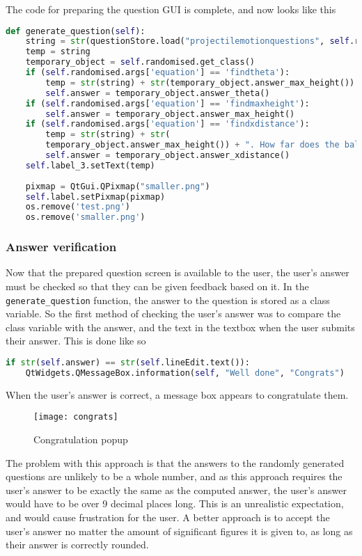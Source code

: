 The code for preparing the question GUI is complete, and now looks like this
\begin{lstlisting}[language=Python, caption=Completed question GUI preparation function]
def generate_question(self):
	string = str(questionStore.load("projectilemotionquestions", self.randomised))
	temp = string
	temporary_object = self.randomised.get_class()
	if (self.randomised.args['equation'] == 'findtheta'):
		temp = str(string) + str(temporary_object.answer_max_height()) + " Find theta in degreees."
		self.answer = temporary_object.answer_theta()
	if (self.randomised.args['equation'] == 'findmaxheight'):
		self.answer = temporary_object.answer_max_height()
	if (self.randomised.args['equation'] == 'findxdistance'):
		temp = str(string) + str(
		temporary_object.answer_max_height()) + ". How far does the ball travel before it hits the ground?"
		self.answer = temporary_object.answer_xdistance()
	self.label_3.setText(temp)
	
	pixmap = QtGui.QPixmap("smaller.png")
	self.label.setPixmap(pixmap)
	os.remove('test.png')
	os.remove('smaller.png')
\end{lstlisting}
\subsubsection{Answer verification}
Now that the prepared question screen is available to the user, the user's answer must be checked so that they can be given feedback based on it. In the \texttt{generate\_question} function, the answer to the question is stored as a class variable. So the first method of checking the user's answer was to compare the class variable with the answer, and the text in the textbox when the user submits their answer. This is done like so
\begin{lstlisting}[language=Python, caption=First method of verifying user's answers]
if str(self.answer) == str(self.lineEdit.text()):
	QtWidgets.QMessageBox.information(self, "Well done", "Congrats")
\end{lstlisting}
When the user's answer is correct, a message box appears to congratulate them.
\begin{figure}[H]
		\centering
		\texttt{[image: congrats]}
		\caption{Congratulation popup}
\end{figure}
The problem with this approach is that the answers to the randomly generated questions are unlikely to be a whole number, and as this approach requires the user's answer to be exactly the same as the computed answer, the user's answer would have to be over 9 decimal places long. This is an unrealistic expectation, and would cause frustration for the user. A better approach is to accept the user's answer no matter the amount of significant figures it is given to, as long as their answer is correctly rounded. 

